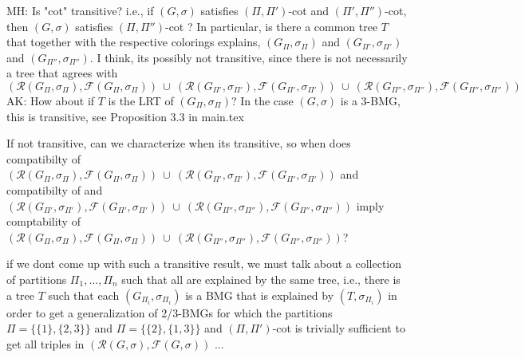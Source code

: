 \documentclass[final,3p,times]{elsarticle}
\newtheorem{lemma}[theorem]{Lemma}%
\newcommand{\TODO}[1]{\begingroup\color{red}#1\endgroup}
\begin{document}
\TODO{MH: Is "cot" transitive? i.e., if $(G,\sigma)$ satisfies $(\Pi,\Pi')$-cot and $(\Pi',\Pi'')$-cot, then 
		$(G,\sigma)$ satisfies $(\Pi,\Pi'')$-cot ? In particular, 
		is there a common tree $T$ that together with the respective colorings explains, 
		$(G_{\Pi},\sigma_{\Pi})$ 
		and $(G_{\Pi'},\sigma_{\Pi'})$ and
		$(G_{\Pi''},\sigma_{\Pi''})$. I think, its possibly not transitive,  since
		there is not necessarily a tree that agrees with
		$$(\mathscr{R}(G_{\Pi},\sigma_{\Pi}),\mathscr{F}(G_{\Pi},\sigma_{\Pi}))\ \cup\ 
		(\mathscr{R}(G_{\Pi'},\sigma_{\Pi'}),\mathscr{F}(G_{\Pi'},\sigma_{\Pi'}))\ \cup\ 
		(\mathscr{R}(G_{\Pi''},\sigma_{\Pi''}),\mathscr{F}(G_{\Pi''},\sigma_{\Pi''}))$$
		AK: How about if $T$ is the LRT of $(G_{\Pi},\sigma_{\Pi})$? In the case $(G,\sigma)$ is a 3-BMG, this is transitive, see Proposition 3.3 in main.tex


If not transitive, can we characterize when its transitive, so when 
does compatibilty of  $(\mathscr{R}(G_{\Pi},\sigma_{\Pi}),\mathscr{F}(G_{\Pi},\sigma_{\Pi}))\ \cup\ 
		(\mathscr{R}(G_{\Pi'},\sigma_{\Pi'}),\mathscr{F}(G_{\Pi'},\sigma_{\Pi'}))$
		and compatibilty of 
		and $
		(\mathscr{R}(G_{\Pi'},\sigma_{\Pi'}),\mathscr{F}(G_{\Pi'},\sigma_{\Pi'}))\ \cup\ 
		(\mathscr{R}(G_{\Pi''},\sigma_{\Pi''}),\mathscr{F}(G_{\Pi''},\sigma_{\Pi''}))$
		imply comptability of 
		$(\mathscr{R}(G_{\Pi},\sigma_{\Pi}),\mathscr{F}(G_{\Pi},\sigma_{\Pi}))\ \cup\ 
		(\mathscr{R}(G_{\Pi''},\sigma_{\Pi''}),\mathscr{F}(G_{\Pi''},\sigma_{\Pi''}))$?
		

if we dont come up with such a transitive result, 
we must talk about a collection of partitions $\Pi_1,\dots,\Pi_n$
such that all are explained by the same tree, i.e.,  there is a tree $T$ such
that each $(G_{\Pi_i},\sigma_{\Pi_i})$ is a BMG that is explained by $(T,\sigma_{\Pi_i})$
in order to get a generalization of 2/3-BMGs for which 
the partitions $\Pi = \{\{1\}, \{2,3\}\}$ and  $\Pi = \{\{2\}, \{1,3\}\}$ 
and $(\Pi,\Pi')$-cot is trivially sufficient to get all triples
in $(\mathscr{R}(G,\sigma),\mathscr{F}(G,\sigma))$ ... 
}	 
	 

\end{document}
